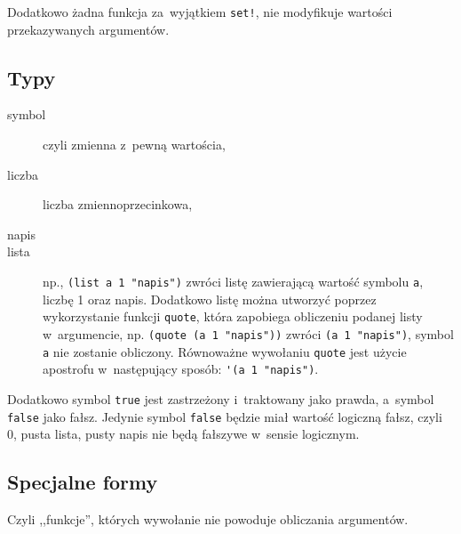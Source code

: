 \documentclass[a4paper,11pt]{article}
\begin{document}
Dodatkowo żadna funkcja za~wyjątkiem \verb+set!+, nie modyfikuje wartości
przekazywanych argumentów.

\subsection{Typy}

\begin{description}
\item[symbol] czyli zmienna z~pewną wartościa,
\item[liczba] liczba zmiennoprzecinkowa,
\item[napis]
\item[lista] np., \verb+(list a 1 "napis")+ zwróci listę zawierającą wartość
  symbolu \verb+a+, liczbę 1 oraz napis. Dodatkowo listę można utworzyć
  poprzez wykorzystanie funkcji \verb+quote+, która zapobiega obliczeniu
  podanej listy w~argumencie, np. \verb+(quote (a 1 "napis"))+ zwróci
  \verb+(a 1 "napis")+, symbol \verb+a+ nie zostanie obliczony. Równoważne
  wywołaniu \verb+quote+ jest użycie apostrofu w~następujący sposób:
  \verb+'(a 1 "napis")+.
\end{description}

Dodatkowo symbol \verb+true+ jest zastrzeżony i~traktowany jako prawda,
a~symbol \verb+false+ jako fałsz. Jedynie symbol \verb+false+ będzie miał
wartość logiczną fałsz, czyli 0, pusta lista, pusty napis nie będą fałszywe
w~sensie logicznym.

\subsection{Specjalne formy}

Czyli ,,funkcje'', których wywołanie nie powoduje obliczania argumentów.
\end{document}
